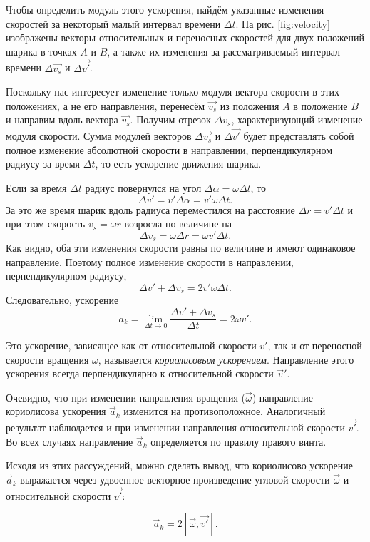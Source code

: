 Чтобы определить модуль этого ускорения, найдём указанные изменения скоростей за некоторый малый интервал времени \(\Delta t\). На рис. \ref{fig:velocity} изображены векторы относительных и переносных скоростей для двух положений шарика в точках \(A\) и \(B\), а также их изменения за рассматриваемый интервал времени \(\Delta \vec{v_s}\) и \(\Delta \vec{v'}\).

Поскольку нас интересует изменение только модуля вектора скорости в этих положениях, а не его направления, перенесём \(\vec{v_s}\) из положения \(A\) в положение \(B\) и направим вдоль вектора \(\vec{v_s}\). Получим отрезок \(\Delta v_s\), характеризующий изменение модуля скорости. Сумма модулей векторов \(\Delta \vec{v_s}\) и \(\Delta \vec{v'}\) будет представлять собой полное изменение абсолютной скорости в направлении, перпендикулярном радиусу за время \(\Delta t\), то есть ускорение движения шарика.

Если за время \(\Delta t\) радиус повернулся на угол \(\Delta \alpha = \omega \Delta t\), то 
\[
\Delta v' = v' \Delta \alpha = v' \omega \Delta t.
\]
За это же время шарик вдоль радиуса переместился на расстояние \(\Delta r = v' \Delta t\) и при этом скорость \(v_s = \omega r\) возросла по величине на 
\[
\Delta v_s = \omega \Delta r = \omega v' \Delta t.
\]
Как видно, оба эти изменения скорости равны по величине и имеют одинаковое направление. Поэтому полное изменение скорости в направлении, перпендикулярном радиусу, 
\[
\Delta v' + \Delta v_s = 2 v' \omega \Delta t.
\]
Следовательно, ускорение 
\[
a_k = \lim_{\Delta t \to 0} \frac{\Delta v' + \Delta v_s}{\Delta t} = 2 \omega v'.
\]

Это ускорение, зависящее как от относительной скорости \(v'\), так и от переносной скорости вращения \(\omega\), называется \textit{кориолисовым ускорением}. 
Направление этого ускорения всегда перпендикулярно к относительной скорости $\vec{v}'$. 

Очевидно, что при изменении направления вращения (\(\vec{\omega}\)) направление кориолисова ускорения \(\vec{a}_k\) изменится на противоположное. Аналогичный результат наблюдается и при изменении направления относительной скорости \(\vec{v'}\). Во всех случаях направление \(\vec{a}_k\) определяется по правилу правого винта.

Исходя из этих рассуждений, можно сделать вывод, что кориолисово ускорение \(\vec{a}_k\) выражается через удвоенное векторное произведение угловой скорости \(\vec{\omega}\) и относительной скорости \(\vec{v'}\):

\[
\vec{a}_k = 2 [\vec{\omega}, \vec{v'}].
\]


